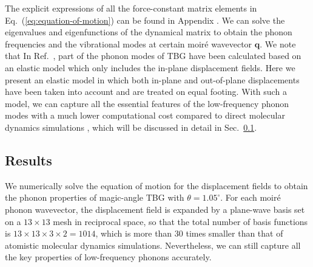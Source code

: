 \documentclass[aps,prx,10pt,twocolumn,superscriptaddress]{revtex4}
\def\IV{{\uppercase\expandafter{\romannumeral 4}}}
\begin{document}
The explicit expressions of all the force-constant matrix elements  in Eq.~(\ref{eq:equation-of-motion}) can be found in Appendix \IV. We can solve the eigenvalues and eigenfunctions of the dynamical matrix to obtain the phonon frequencies and the vibrational modes at certain moir\'e wavevector $\textbf{q}$. We note that In Ref.~\cite{koshino-phonon-prb19}, part of the phonon modes of TBG have been calculated based on an elastic model which only includes the in-plane displacement fields. Here we present an elastic model in which both in-plane and out-of-plane displacements have been taken into account and are treated on equal footing. With such a model, we can capture all the essential features of the low-frequency phonon modes with a much lower computational cost compared to direct molecular dynamics simulations \cite{angeli-tbg-prx19,liu-phonon-nano22}, which will be discussed in detail in Sec.~\ref{sec:phonon-results}.

\subsection{Results}
\label{sec:phonon-results}

We numerically solve the equation of motion for the displacement fields to obtain the phonon properties of magic-angle TBG with $\theta=1.05^{\circ}$. 
For each moir\'e phonon wavevector, the displacement field is expanded by a plane-wave basis set on a $13\times 13$ mesh in reciprocal space, so that the total number of basis functions is $13\times 13\times3\times 2=1014$, which is more than 30 times smaller than that of atomistic molecular dynamics simulations.
Nevertheless, we can still capture all the key properties of low-frequency phonons accurately. 
\end{document}
